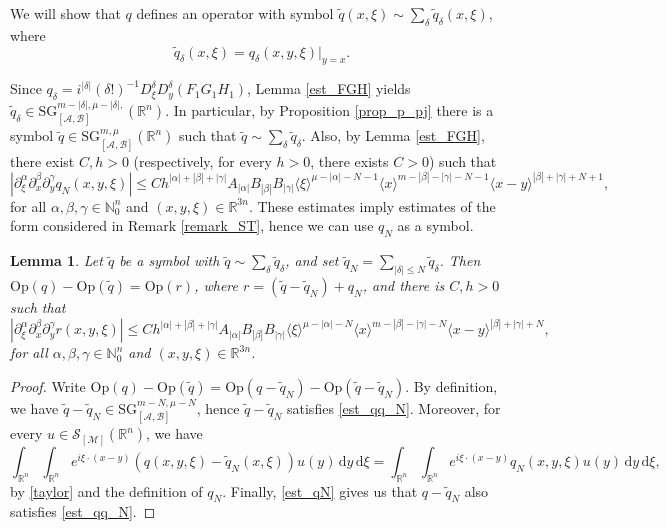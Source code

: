 \documentclass[11pt,reqno]{amsart}
\numberwithin{equation}{section}
\newtheorem{lemma}[theorem]{Lemma}
\newcommand{\caS}{{\mathcal{S}}}
\newcommand{\SG}{{\mathrm{SG}}}
\newcommand{\M}{{\mathcal{M}}} %
\newcommand{\A}{{\mathcal{A}}} %
\newcommand{\B}{{\mathcal{B}}} %
\begin{document}
We will show that $q$ defines an operator with symbol $\tilde{q}(x,\xi)\sim \sum_{\delta}\tilde{q}_\delta(x,\xi)$, where
\[\tilde{q}_\delta(x,\xi) = q_\delta(x,y,\xi)|_{y=x}.\]

Since $q_\delta=i^{|\delta|}(\delta!)^{-1}D_\xi^\delta D_y^\delta (F_1G_1H_1)$, Lemma \ref{est_FGH} yields 
$\tilde{q}_\delta\in {\SG}_{[\A,\B]}^{m-|\delta|,\mu-|\delta|,}(\mathbb{R}^n)$. In particular, by Proposition 
\ref{prop_p_pj} there is a symbol $\tilde{q}\in {\SG}_{[\A,\B]}^{m,\mu}(\mathbb{R}^n)$ such that 
$\tilde{q}\sim \sum_{\delta}\tilde{q}_\delta$. Also, by Lemma \ref{est_FGH}, there exist $C,h>0$ (respectively, for every $h>0$, there exists $C>0$) such that
%
\begin{equation}\label{est_qN}
	|\partial_\xi^\alpha\partial_x^\beta\partial_y^\gamma q_N(x,y,\xi)|\leq C h^{|\alpha|+|\beta|+|\gamma|} A_{|\alpha|}B_{|\beta|}B_{|\gamma|} \langle\xi\rangle^{\mu-|\alpha|-N-1} \langle x\rangle^{m-|\beta|-|\gamma|-N-1} \langle x-y\rangle^{|\beta|+|\gamma|+N+1},
\end{equation}
%
for all $\alpha,\beta,\gamma\in\mathbb{N}_0^n$ and $(x,y,\xi)\in\mathbb{R}^{3n}$. These estimates imply estimates of the form considered in Remark \ref{remark_ST}, hence we can use $q_N$ as a symbol.


\begin{lemma}\label{lemma_cd}
	Let $\tilde{q}$ be a symbol with $\tilde{q}\sim \sum_{\delta}\tilde{q}_\delta$, and set $\tilde{q}_N = \sum_{|\delta|\leq N} \tilde{q}_\delta$. 
	Then $\mathrm{Op}(q)-\mathrm{Op}(\tilde{q})=\mathrm{Op}(r)$, where $r=(\tilde{q}-\tilde{q}_N)+q_N$, and there is $C,h>0$ such that
	\begin{equation}\label{est_qq_N}
		|\partial_\xi^\alpha\partial_x^\beta\partial_y^\gamma r(x,y,\xi)|\leq 
		C h^{|\alpha|+|\beta|+|\gamma|} A_{|\alpha|}B_{|\beta|}B_{|\gamma|} 
		\langle \xi\rangle^{\mu-|\alpha|-N} \langle x\rangle^{m-|\beta|-|\gamma|-N} \langle x-y\rangle^{|\beta|+|\gamma|+N},
	\end{equation}
	for all $\alpha,\beta,\gamma\in\mathbb{N}_0^n$ and $(x,y,\xi)\in\mathbb{R}^{3n}$.
\end{lemma}
%
\begin{proof}
	Write $\mathrm{Op}(q)-\mathrm{Op}(\tilde q) = \mathrm{Op}(q-\tilde{q}_N) - \mathrm{Op}(\tilde q-\tilde{q}_N)$. 
	By definition, we have $\tilde{q}-\tilde{q}_N \in {\SG}_{[\A,\B]}^{m-N,\mu-N}$, hence $\tilde{q}-\tilde{q}_N$ satisfies \eqref{est_qq_N}. 
	Moreover, for every $u\in\caS_{[\M]}(\mathbb{R}^n)$, we have
	\begin{equation*}
		\int_{\mathbb{R}^n}\int_{\mathbb{R}^n} e^{i\xi\cdot(x-y)}(q(x,y,\xi)-\tilde{q}_N(x,\xi))u(y)\,\mathrm{d}y\, \mathrm{d}\xi = 
		\int_{\mathbb{R}^n}\int_{\mathbb{R}^n} e^{i\xi\cdot(x-y)}q_N(x,y,\xi)u(y)\,\mathrm{d}y\, \mathrm{d}\xi,
	\end{equation*}
	by \eqref{taylor} and the definition of $q_N$. Finally, \eqref{est_qN} gives us that $q-\tilde{q}_N$ also satisfies \eqref{est_qq_N}.
\end{proof}
\end{document}
